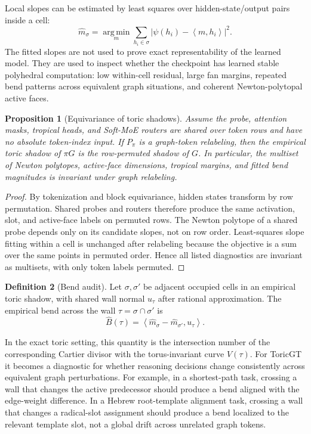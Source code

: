 \documentclass[11pt]{article}
\theoremstyle{definition}
\newtheorem{definition}{Definition}[section]
\theoremstyle{plain}
\newtheorem{proposition}[definition]{Proposition}
\theoremstyle{remark}
\numberwithin{equation}{section}
\newcommand{\argmin}{\operatorname*{arg\,min}}
\newcommand{\abs}[1]{\left\lvert #1\right\rvert}
\newcommand{\ip}[2]{\left\langle #1,#2\right\rangle}
\begin{document}
Local slopes can be estimated by least squares over hidden-state/output pairs inside a cell:
\begin{equation}
  \widehat m_\sigma
  =\argmin_m\sum_{h_i\in\sigma}\abs{\psi(h_i)-\ip{m}{h_i}}^2.
\end{equation}
The fitted slopes are not used to prove exact representability of the learned model.  They are used to inspect whether the checkpoint has learned stable polyhedral computation: low within-cell residual, large fan margins, repeated bend patterns across equivalent graph situations, and coherent Newton-polytopal active faces.

\begin{proposition}[Equivariance of toric shadows]
Assume the probe, attention masks, tropical heads, and Soft-MoE routers are shared over token rows and have no absolute token-index input.  If $P_\pi$ is a graph-token relabeling, then the empirical toric shadow of $\pi G$ is the row-permuted shadow of $G$.  In particular, the multiset of Newton polytopes, active-face dimensions, tropical margins, and fitted bend magnitudes is invariant under graph relabeling.
\end{proposition}

\begin{proof}
By tokenization and block equivariance, hidden states transform by row permutation.  Shared probes and routers therefore produce the same activation, slot, and active-face labels on permuted rows.  The Newton polytope of a shared probe depends only on its candidate slopes, not on row order.  Least-squares slope fitting within a cell is unchanged after relabeling because the objective is a sum over the same points in permuted order.  Hence all listed diagnostics are invariant as multisets, with only token labels permuted.
\end{proof}

\begin{definition}[Bend audit]
Let $\sigma,\sigma'$ be adjacent occupied cells in an empirical toric shadow, with shared wall normal $u_{\tau}$ after rational approximation.  The empirical bend across the wall $\tau=\sigma\cap\sigma'$ is
\begin{equation}
  \widehat B(\tau)=\ip{\widehat m_\sigma-\widehat m_{\sigma'}}{u_\tau}.
\end{equation}
\end{definition}

In the exact toric setting, this quantity is the intersection number of the corresponding Cartier divisor with the torus-invariant curve $V(\tau)$.  For ToricGT it becomes a diagnostic for whether reasoning decisions change consistently across equivalent graph perturbations.  For example, in a shortest-path task, crossing a wall that changes the active predecessor should produce a bend aligned with the edge-weight difference.  In a Hebrew root-template alignment task, crossing a wall that changes a radical-slot assignment should produce a bend localized to the relevant template slot, not a global drift across unrelated graph tokens.
\end{document}
